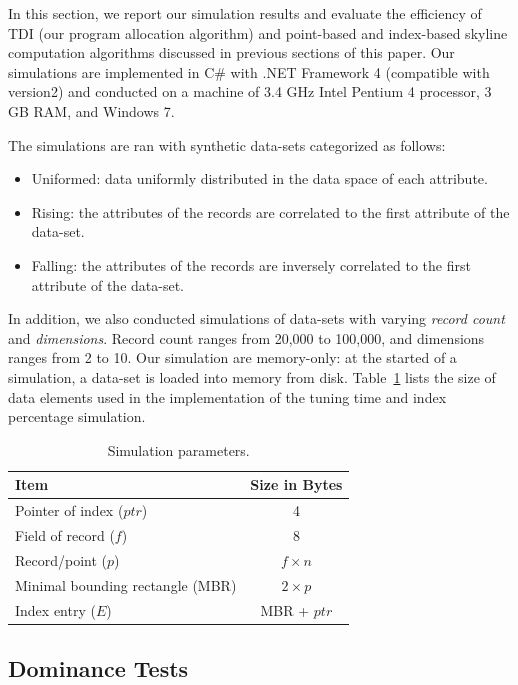 In this section, we report our simulation results and evaluate the efficiency of TDI (our program allocation algorithm) and point-based and index-based skyline computation algorithms discussed in previous sections of this paper. Our simulations are implemented in C\# with .NET Framework 4 (compatible with version2) and conducted on a machine of 3.4 GHz Intel Pentium 4 processor, 3 GB RAM, and Windows 7.

The simulations are ran with synthetic data-sets categorized as follows:

\begin{itemize}
\item Uniformed: data uniformly distributed in the data space of each
    attribute.
\item Rising: the attributes of the records are correlated to the first
    attribute of the data-set.
\item Falling: the attributes of the records are inversely correlated to
    the first attribute of the data-set.
\end{itemize}

In addition, we also conducted simulations of data-sets with varying \emph{record count} and \emph{dimensions}.  Record count ranges from 20,000 to 100,000, and dimensions ranges from 2 to 10. Our simulation are memory-only: at the started of a simulation, a data-set is loaded into memory from disk. Table~\ref{tab:sim_size} lists the size of data elements used in the implementation of the tuning time and index percentage simulation.

\begin{table}[h]
\caption{Simulation parameters.}
\label{tab:sim_size}
\centering
\begin{tabular}{l|c}
\hline
{\bf Item} & {\bf Size in Bytes}\\
\hline
Pointer of index ($ptr$) & 4\\
Field of record ($f$) & 8\\
Record/point ($p$) & $f \times n$\\
Minimal bounding rectangle (MBR) & $2 \times p$\\
Index entry ($E$) & MBR + $ptr$\\
\hline
\end{tabular}
\end{table}

\subsection{Dominance Tests}\label{sec:exp_dom_test}

